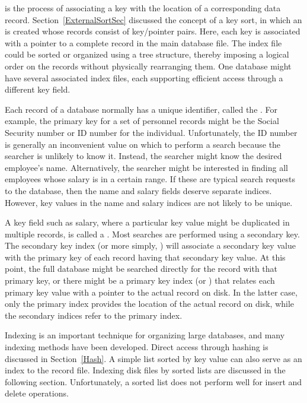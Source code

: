  is the process of associating a key with the location
of a corresponding data record.
Section~\ref{ExternalSortSec} discussed the concept of a key sort, in
which an  is created whose
records consist of key/pointer pairs.
Here, each key is associated with a pointer to a complete record in
the main database file.
The index file could be sorted or organized using a tree structure,
thereby imposing a logical order on the records without
physically rearranging them.
One database might have several associated index files,
each supporting efficient access through a different key field.

Each record of a database normally has a unique identifier,
called the .
For example, the primary key for a set of personnel records might be
the Social Security number or ID number for the individual.
Unfortunately, the ID number is generally an inconvenient value on
which to perform a search because the searcher is unlikely to know it.
Instead, the searcher might know the desired employee's name.
Alternatively, the searcher might be interested in finding all
employees whose salary is in a certain range.
If these are typical search requests to the database, then the name
and salary fields deserve separate indices.
However, key values in the name and salary indices are not likely to
be unique.

A key field such as salary, where a particular key value might be
duplicated in multiple records, is called a
.
Most searches are performed using a secondary key.
The secondary key index (or more simply,
)
will associate a secondary key value with the primary key of each
record having that secondary key value.
At this point, the full database might be searched directly for the
record with that primary key, or there might be a primary key index
(or ) 
that relates each primary key value with a pointer to the
actual record on disk.
In the latter case, only the primary index provides the
location of the actual record on disk, while the secondary indices 
refer to the primary index.

Indexing is an important technique for organizing large databases,
and many indexing methods have been developed.
Direct access through hashing is discussed in
Section~\ref{Hash}.
A simple list sorted by key
value can also serve as an index to the record file.
Indexing disk files by sorted lists are discussed in the following
section.
Unfortunately, a sorted list does not perform well for insert
and delete operations.

